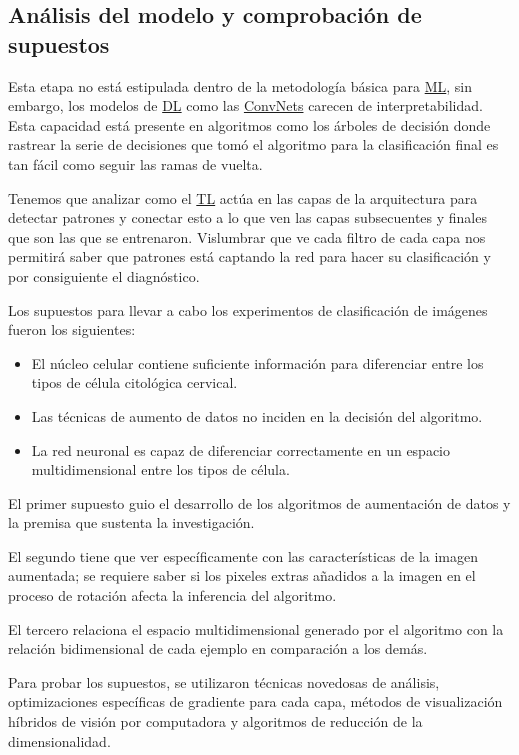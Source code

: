 \subsection{Análisis del modelo y comprobación de supuestos}

Esta etapa no está estipulada dentro de la metodología básica para
\hyperlink{abbr}{ML}, sin embargo, los modelos de \hyperlink{abbr}{DL} como las
\hyperlink{abbr}{ConvNets} carecen de interpretabilidad. Esta capacidad está
presente en algoritmos como los árboles de decisión donde rastrear la serie de
decisiones que tomó el algoritmo para la clasificación final es tan fácil como
seguir las ramas de vuelta.

Tenemos que analizar como el \hyperlink{abbr}{TL} actúa en las capas de la arquitectura para
detectar patrones y conectar esto a lo que ven las capas subsecuentes y finales
que son las que se entrenaron. Vislumbrar que ve cada filtro de cada capa nos
permitirá saber que patrones está captando la red para hacer su clasificación y
por consiguiente el diagnóstico.

Los supuestos para llevar a cabo los experimentos de clasificación de imágenes
fueron los siguientes:

\begin{itemize}
  \item El núcleo celular contiene suficiente información para diferenciar entre
  los tipos de célula citológica cervical.
  \item Las técnicas de aumento de datos no inciden en la decisión del
  algoritmo.
  \item La red neuronal es capaz de diferenciar correctamente en un espacio
  multidimensional entre los tipos de célula.
\end{itemize}

El primer supuesto guio el desarrollo de los algoritmos de aumentación de datos
y la premisa que sustenta la investigación. 

El segundo tiene que ver específicamente con las características de la imagen
aumentada; se requiere saber si los pixeles extras añadidos a la imagen en el
proceso de rotación afecta la inferencia del algoritmo.

El tercero relaciona el espacio multidimensional generado por el algoritmo con
la relación bidimensional de cada ejemplo en comparación a los demás.

Para probar los supuestos, se utilizaron técnicas novedosas de análisis,
optimizaciones específicas de gradiente para cada capa, métodos de visualización
híbridos de visión por computadora y algoritmos de reducción de la
dimensionalidad.

